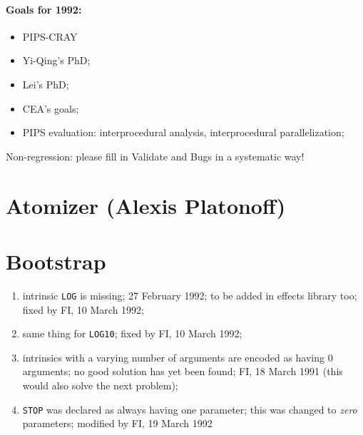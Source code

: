 \paragraph{Goals for 1992:}

\begin{itemize}

  \item PIPS-CRAY

  \item Yi-Qing's PhD;

  \item Lei's PhD;

  \item CEA's goals;

  \item PIPS evaluation: interprocedural analysis, interprocedural
        parallelization;

\end{itemize}

Non-regression: please fill in Validate and Bugs in a systematic way!

\section{Atomizer (Alexis Platonoff)}

\section{Bootstrap}

\begin{enumerate}

  \item intrinsic \verb+LOG+ is missing; 27 February 1992; to be added
        in effects library too; fixed by FI, 10 March 1992;

  \item same thing for \verb+LOG10+; fixed by FI, 10 March 1992;

  \item intrinsics with a varying number of arguments are encoded
        as having 0 arguments; no good solution has yet been found;
        FI, 18 March 1991 (this would also solve the next problem);

  \item \verb+STOP+ was declared as always having one parameter;
        this was changed to {\em zero} parameters; modified by
        FI, 19 March 1992

\end{enumerate}


